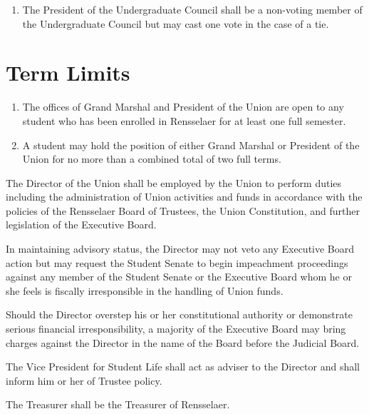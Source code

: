 \documentclass[12pt]{constitution}
\begin{document}
\begin{enumerate}
\item The President of the Undergraduate Council shall be a non-voting member of the
Undergraduate Council but may cast one vote in the case of a tie.
\end{enumerate}

\section{Term Limits}
\begin{enumerate}
\item The offices of Grand Marshal and President of the Union are open to any student who has been
enrolled in Rensselaer for at least one full semester.
\item A student may hold the position of either Grand Marshal or President of the Union for no more than a combined total of two full terms.
\end{enumerate}

The Director of the Union shall be employed by the Union to perform duties including the administration of Union activities and funds in accordance with the policies of the Rensselaer Board of Trustees, the Union Constitution, and further legislation of the Executive Board.

\vspace{12pt}

In maintaining advisory status, the Director may not veto any Executive Board action but may request the Student Senate to begin impeachment proceedings against any member of the Student Senate or the Executive Board whom he or she feels is fiscally irresponsible in the handling of Union funds.

\vspace{12pt}

Should the Director overstep his or her constitutional authority or demonstrate serious financial irresponsibility, a majority of the Executive Board may bring charges against the Director in the name of the Board before the Judicial Board.

\vspace{12pt}

The Vice President for Student Life shall act as adviser to the Director and shall inform him or her of Trustee policy.

The Treasurer shall be the Treasurer of Rensselaer.

\vspace{12pt}
\end{document}
